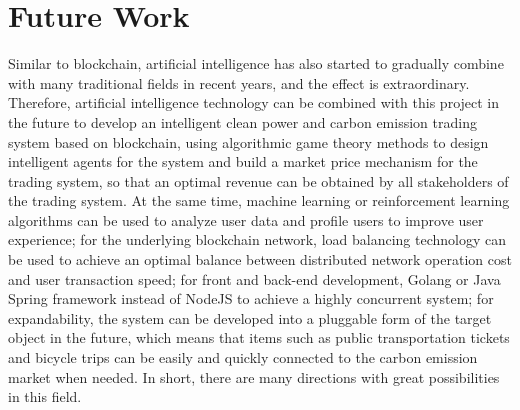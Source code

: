 \section{Future Work}
Similar to blockchain, artificial intelligence has also started to gradually combine with many traditional fields in recent years, and the effect is extraordinary. Therefore, artificial intelligence technology can be combined with this project in the future to develop an intelligent clean power and carbon emission trading system based on blockchain, using algorithmic game theory methods to design intelligent agents for the system and build a market price mechanism for the trading system, so that an optimal revenue can be obtained by all stakeholders of the trading system. At the same time, machine learning or reinforcement learning algorithms can be used to analyze user data and profile users to improve user experience; for the underlying blockchain network, load balancing technology can be used to achieve an optimal balance between distributed network operation cost and user transaction speed; for front and back-end development, Golang or Java Spring framework instead of NodeJS to achieve a highly concurrent system; for expandability, the system can be developed into a pluggable form of the target object in the future, which means that items such as public transportation tickets and bicycle trips can be easily and quickly connected to the carbon emission market when needed. In short, there are many directions with great possibilities in this field.